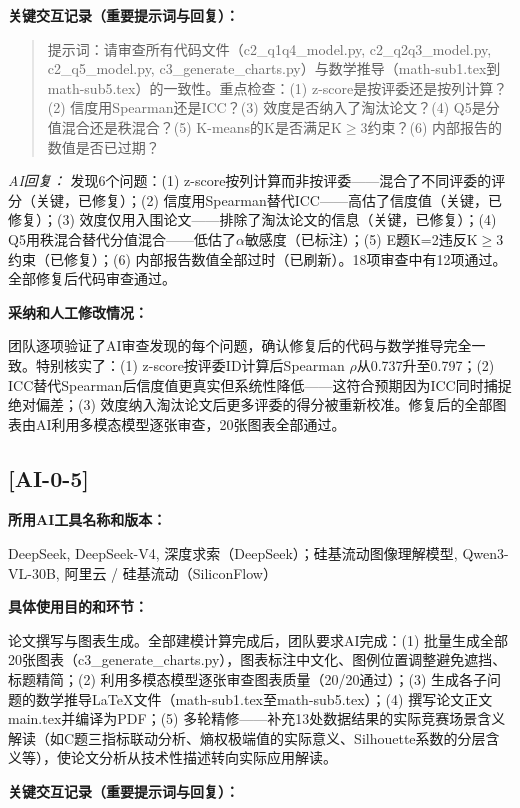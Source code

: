\documentclass[12pt,a4paper]{ctexart}
\begin{document}
\textbf{关键交互记录（重要提示词与回复）：}\par

\begin{quote}
提示词：请审查所有代码文件（c2\_q1q4\_model.py, c2\_q2q3\_model.py, c2\_q5\_model.py, c3\_generate\_charts.py）与数学推导（math-sub1.tex到math-sub5.tex）的一致性。重点检查：(1) z-score是按评委还是按列计算？(2) 信度用Spearman还是ICC？(3) 效度是否纳入了淘汰论文？(4) Q5是分值混合还是秩混合？(5) K-means的K是否满足K$\geq$3约束？(6) 内部报告的数值是否已过期？
\end{quote}

\textit{AI回复：} 发现6个问题：(1) z-score按列计算而非按评委——混合了不同评委的评分（关键，已修复）；(2) 信度用Spearman替代ICC——高估了信度值（关键，已修复）；(3) 效度仅用入围论文——排除了淘汰论文的信息（关键，已修复）；(4) Q5用秩混合替代分值混合——低估了$\alpha$敏感度（已标注）；(5) E题K=2违反K$\geq$3约束（已修复）；(6) 内部报告数值全部过时（已刷新）。18项审查中有12项通过。全部修复后代码审查通过。

\textbf{采纳和人工修改情况：}\par
团队逐项验证了AI审查发现的每个问题，确认修复后的代码与数学推导完全一致。特别核实了：(1) z-score按评委ID计算后Spearman $\rho$从0.737升至0.797；(2) ICC替代Spearman后信度值更真实但系统性降低——这符合预期因为ICC同时捕捉绝对偏差；(3) 效度纳入淘汰论文后更多评委的得分被重新校准。修复后的全部图表由AI利用多模态模型逐张审查，20张图表全部通过。

\subsection*{[AI-0-5]}

\textbf{所用AI工具名称和版本：}\par
DeepSeek, DeepSeek-V4, 深度求索（DeepSeek）；硅基流动图像理解模型, Qwen3-VL-30B, 阿里云 / 硅基流动（SiliconFlow）

\textbf{具体使用目的和环节：}\par
论文撰写与图表生成。全部建模计算完成后，团队要求AI完成：(1) 批量生成全部20张图表（c3\_generate\_charts.py），图表标注中文化、图例位置调整避免遮挡、标题精简；(2) 利用多模态模型逐张审查图表质量（20/20通过）；(3) 生成各子问题的数学推导LaTeX文件（math-sub1.tex至math-sub5.tex）；(4) 撰写论文正文main.tex并编译为PDF；(5) 多轮精修——补充13处数据结果的实际竞赛场景含义解读（如C题三指标联动分析、熵权极端值的实际意义、Silhouette系数的分层含义等），使论文分析从技术性描述转向实际应用解读。

\textbf{关键交互记录（重要提示词与回复）：}\par
\end{document}

